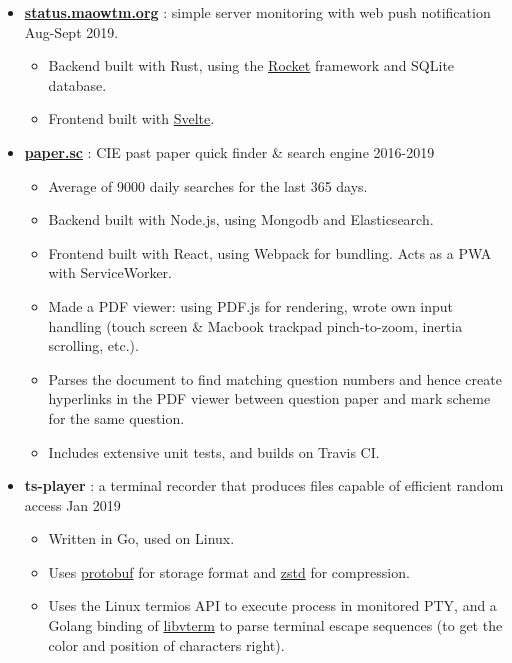 \documentclass[a4paper]{article}
\begin{document}
  \begin{itemize}

    \item \href{https://status.maowtm.org}{\color{link}\textbf{status.maowtm.org}} : simple server monitoring with web push notification \dashdiv{} Aug-Sept 2019.

    \begin{itemize}
      \item Backend built with Rust, using the \href{https://rocket.rs}{\color{link}Rocket} framework and SQLite database.
      \item Frontend built with \href{https://svelte.dev/}{\color{link}Svelte}.
    \end{itemize}

    \item \href{https://paper.sc}{\color{link}\textbf{paper.sc}} : CIE past paper quick finder \& search engine \dashdiv{} 2016-2019

    \begin{itemize}
      \item Average of \texttildelow{}9000 daily searches for the last 365 days.
      \item Backend built with Node.js, using Mongodb and Elasticsearch.
      \item Frontend built with React, using Webpack for bundling. Acts as a PWA with ServiceWorker.
      \item Made a PDF viewer: using PDF.js for rendering, wrote own input handling (touch screen \& Macbook trackpad pinch-to-zoom, inertia scrolling, etc.).
      \item Parses the document to find matching question numbers and hence create hyperlinks in the PDF viewer between question paper and mark scheme for the same question.
      \item Includes extensive unit tests, and builds on Travis CI.
    \end{itemize}

    \item \textbf{ts-player} : a terminal recorder that produces files capable of efficient random access \dashdiv{} Jan 2019

    \begin{itemize}
      \item Written in Go, used on Linux.
      \item Uses \href{https://developers.google.com/protocol-buffers}{\color{link}protobuf} for storage format and \href{https://facebook.github.io/zstd/}{\color{link}zstd} for compression.
      \item Uses the Linux termios API to execute process in monitored PTY, and a Golang binding of \href{http://www.leonerd.org.uk/code/libvterm/}{\color{link}libvterm} to parse terminal escape sequences (to get the color and position of characters right).
    \end{itemize}


\end{itemize}
\end{document}
